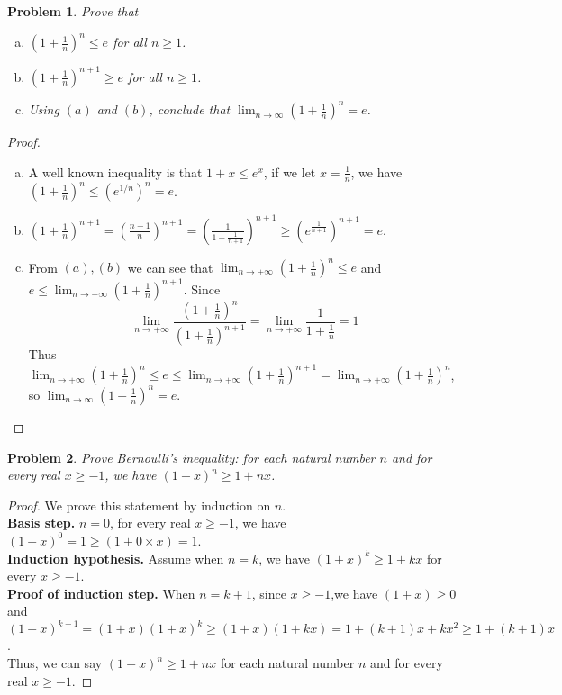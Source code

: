 \documentclass[12pt]{article}
\newtheorem{hw}{Problem}
\begin{document}
\begin{hw}
 Prove that

\begin{enumerate}[(a)]
  \item $\left(1+ \frac{1}{n}\right)^n\leq e$ for all $n\geq 1$.
  \item $\left(1+\frac{1}{n}\right)^{n+1}\geq e$ for all $n\geq 1$.
  \item Using $(a)$ and $(b)$, conclude that $\lim_{n\rightarrow \infty}\left(1+\frac{1}{n}\right)^n =e$.
\end{enumerate}
\end{hw}
\begin{proof}
	\noindent
	\begin{enumerate}[(a)]
		\item A well known inequality is that $1 + x \leq e^{x}$, if we let $x = \frac{1}{n}$, we have $\left(1+ \frac{1}{n}\right)^{n}\leq \left(e^{1/n}\right)^{n} = e$.
		
		\item $\left(1+\frac{1}{n}\right)^{n+1} = \left(\frac{n+1}{n}\right)^{n+1} = \left(\frac{1}{1 - \frac{1}{n+1}}\right)^{n+1} \geq \left( e^{\frac{1}{n+1}}\right)^{n+1} = e$.
		
		\item 
		From $(a),(b)$ we can see that $\lim_{n \rightarrow +\infty}\left(1+ \frac{1}{n}\right)^n\leq e$ and $e \leq \lim_{n \rightarrow +\infty}\left(1+\frac{1}{n}\right)^{n+1}$. Since $$\lim_{n \rightarrow +\infty}\frac{\left(1+ \frac{1}{n}\right)^n}{\left(1+\frac{1}{n}\right)^{n+1}} = \lim_{n \rightarrow +\infty}\frac{1}{1 + \frac{1}{n}} = 1$$
		Thus $\lim_{n \rightarrow +\infty}\left(1+ \frac{1}{n}\right)^n\leq e \leq \lim_{n \rightarrow +\infty}\left(1+\frac{1}{n}\right)^{n+1} = \lim_{n \rightarrow +\infty}\left(1+ \frac{1}{n}\right)^n$, so $\lim_{n\rightarrow \infty}\left(1+\frac{1}{n}\right)^n =e$.
	\end{enumerate}
\end{proof}


\begin{hw}
Prove \emph{Bernoulli's inequality}: for each natural number $n$ and for every real $x\geq -1$, we have $(1+x)^n\geq 1+nx$.
\end{hw}
\begin{proof}
	We prove this statement by induction on $n$.\\
	\textbf{Basis step.} $n = 0$, for every real $x\geq -1$, we have $(1+x)^{0} = 1 \geq (1 + 0\times x) = 1$.\\
	\textbf{Induction hypothesis.} Assume when $n = k$, we have $(1+x)^{k} \geq 1 + kx$ for every $x \geq -1$.\\
	\textbf{Proof of induction step.} When $n = k+1$, since $x \geq -1$,we have $(1+x) \geq 0$ and $(1+x)^{k+1} = (1+x)(1+x)^{k} \geq (1+x)(1+kx) = 1 + (k+1)x + kx^{2} \geq 1 + (k+1)x$.\\
	Thus, we can say $(1+x)^n\geq 1+nx$ for each natural number $n$ and for every real $x\geq -1$.
\end{proof}
\end{document}

